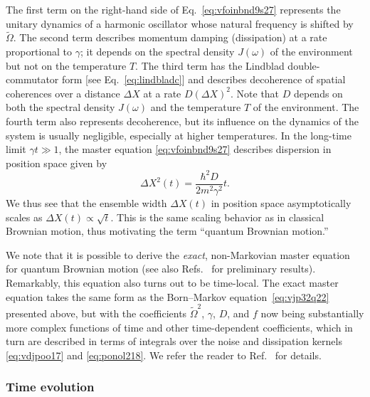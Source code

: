 \documentclass[3p,sort&compress,12pt]{elsarticle}
\begin{document}
% 
The first term on the right-hand side of Eq.~\eqref{eq:vfoinbnd9s27} represents the unitary dynamics of a harmonic oscillator whose natural frequency is shifted by $\widetilde{\Omega}$. The second term describes momentum damping (dissipation) at a rate proportional to $\gamma$; it depends on the spectral density $J(\omega)$ of the environment but not on the temperature $T$. The third term has the Lindblad double-commutator form [see Eq.~\eqref{eq:lindbladc}] and describes decoherence of spatial coherences over a distance $\Delta X$ at a rate $D(\Delta X)^2$. Note that $D$ depends on both the spectral density $J(\omega)$ and the temperature $T$ of the environment. The fourth term also represents decoherence, but its influence on the dynamics of the system is usually negligible, especially at higher temperatures. In the long-time limit $\gamma t \gg 1$, the master equation \eqref{eq:vfoinbnd9s27} describes dispersion in position space given by
%
\begin{equation}
  \Delta X^2(t) = \frac{\hbar^2D}{2m^2 \gamma^2} t.
\end{equation}
%
We thus see that the ensemble width $\Delta X(t)$ in position space asymptotically scales as $\Delta X(t) \propto \sqrt{t}$. This is the same scaling behavior as in classical Brownian motion, thus motivating the term ``quantum Brownian motion.'' 

We note that it is possible to derive the \emph{exact}, non-Markovian master equation for quantum Brownian motion \cite{Hu:1992:om} (see also Refs.~\cite{Caldeira:1983:on,Caldeira:1985:tt,Haake:1932:tt,Grabert:1988:bf,Unruh:1989:rc} for preliminary results). Remarkably, this equation also turns out to be time-local. The exact master equation takes the same form as the Born--Markov equation~\eqref{eq:vjp32q22} presented above, but with the coefficients $\widetilde{\Omega}^2$, $\gamma$, $D$, and $f$ now being substantially more complex functions of time and other
time-dependent coefficients, which in turn are described in terms of integrals over the noise and dissipation kernels \eqref{eq:vdjpoo17} and
\eqref{eq:ponol218}. We refer the reader to Ref.~\cite{Hu:1992:om} for details. 

\subsubsection{Time evolution}
\end{document}
